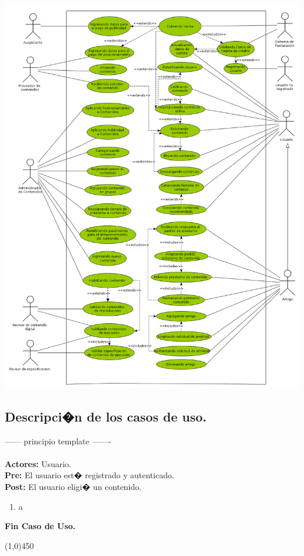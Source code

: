 \documentclass[11pt, a4paper, spanish]{article}
\begin{document}
	\begin{center}
		\includegraphics[scale=0.37]{Diagramas/01-CasosdeUsoCU.png}
	\end{center}

\newpage

\subsection{Descripci�n de los casos de uso.}

------ principio template -------\\
 \\
\textbf{Actores:} Usuario. \\
\textbf{Pre:} El usuario est� registrado y autenticado. \\
\textbf{Post:} El usuario eligi� un contenido.\\
\begin{enumerate}
	\item a
\end{enumerate}
\textbf{Fin Caso de Uso.}
 \\
\begin{center} \line(1,0){450} \end{center}
\end{document}
